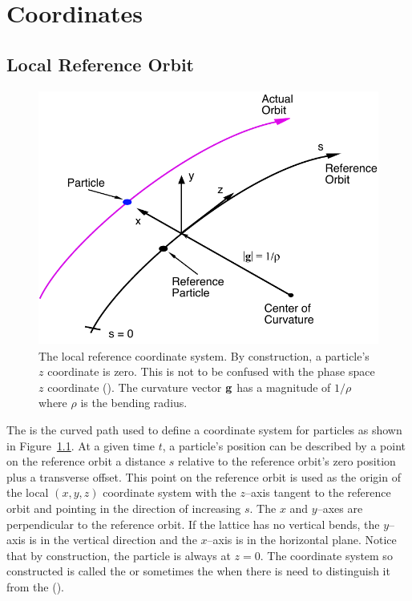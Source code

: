 \chapter{Coordinates}

\section{Local Reference Orbit}
\label{s:ref}


\begin{figure}[!b]
  \centering
  \includegraphics[height=8.4cm]{local-coords.pdf}
  \caption[The Local Reference System.]
{The local reference coordinate system. By construction, a
particle's $z$ coordinate is zero.  This is not to be confused with
the phase space $z$ coordinate ().  The curvature
vector ${\bf g}$ has a magnitude of $1/\rho$ where $\rho$ is the bending
radius.}
  \label{f:local.coords}
\end{figure}

The  is the curved path used to define a
coordinate system for particles as shown in
Figure~\ref{f:local.coords}. At a given time $t$, a particle's
position can be described by a point on the reference orbit a distance
$s$ relative to the reference orbit's zero position plus a transverse
offset. This point on the reference orbit is used as the origin of the
local $(x, y, z)$ coordinate system with the $z$--axis tangent to the
reference orbit and pointing in the direction of increasing $s$. The
$x$ and $y$--axes are perpendicular to the reference orbit. If the
lattice has no vertical bends, the $y$--axis is in the vertical
direction and the $x$--axis is in the horizontal plane. Notice that by
construction, the particle is always at $z = 0$. The coordinate system
so constructed is called the  or sometimes
the  when there is need to
distinguish it from the 
().

